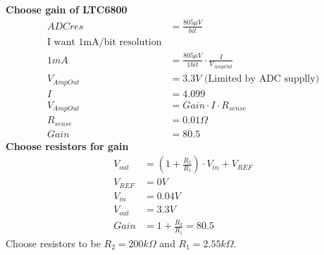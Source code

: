 \documentclass{article}
\numberwithin{figure}{section}
\numberwithin{equation}{section}
\begin{document}
{\textbf{Choose gain of LTC6800}
\begin{align}
  \label{eq:asense}
  ADCres &= \frac{805\mu V}{bit} \\
  \mbox{I want 1mA/bit resolution} \\
  1mA &= \frac{805\mu V}{1bit} \cdot \frac{I}{V_{AmpOut}} \\
  V_{AmpOut} &= 3.3V \mbox{ (Limited by ADC supplly)} \\
  I &= 4.099 \\
  V_{AmpOut} &= Gain \cdot I \cdot R_{sense} \\
  R_{sense} &= 0.01 \Omega \\
  Gain &= 80.5
\end{align}
\textbf{Choose resistors for gain}
\begin{align}
  \label{eq:gainresistors}
  V_{out} &= \left(1+\frac{R_2}{R_1}\right)\cdot V_{in} + V_{REF} \\
  V_{REF} &= 0V \\
  V_{in} &= 0.04V \\
  V_{out} &= 3.3V \\
  Gain &= 1+\frac{R_2}{R_1} = 80.5
\end{align}
Choose resistors to be $R_2=200k\Omega$ and $R_1=2.55k\Omega$.

}
\end{document}
